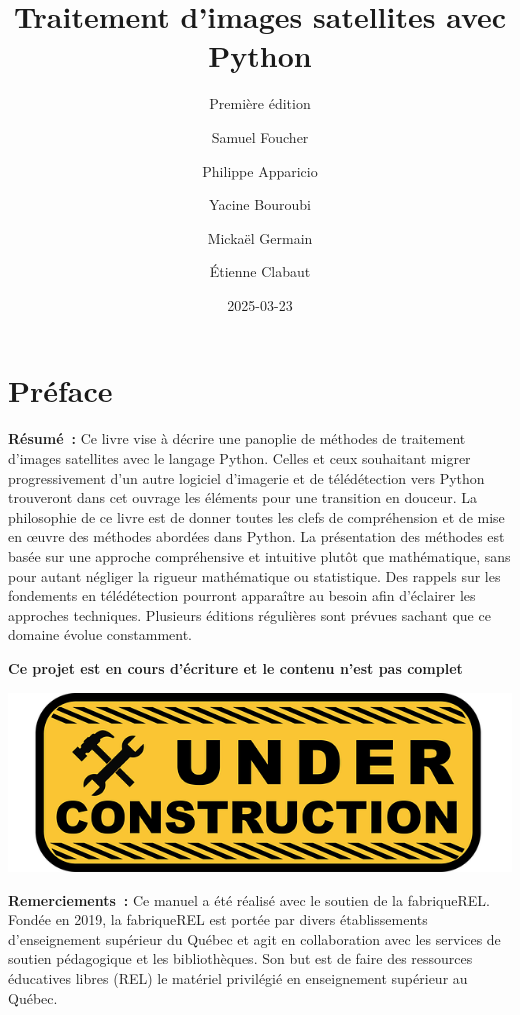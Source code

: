 \documentclass[
  11pt,
  letterpaper,
  open=any,
  twoside=false,
  french]{scrbook}
\title{Traitement d'images satellites avec Python}
\subtitle{Première édition}
\author{Samuel Foucher \and Philippe Apparicio \and Yacine
Bouroubi \and Mickaël Germain \and Étienne Clabaut}
\date{2025-03-23}
\renewcommand*\contentsname{Table des matières}
\newcommand\contentsname{Table des matières}
\begin{document}
\frontmatter
\maketitle

\renewcommand*\contentsname{Table des matières}
{
\hypersetup{linkcolor=}
\setcounter{tocdepth}{2}
\tableofcontents
}
\listoffigures
\listoftables

\mainmatter
{}

\chapter*{Préface}\label{pruxe9face}


\renewcommand{\partname}{}

\textbf{Résumé~:} Ce livre vise à décrire une panoplie de méthodes de
traitement d'images satellites avec le langage Python. Celles et ceux
souhaitant migrer progressivement d'un autre logiciel d'imagerie et de
télédétection vers Python trouveront dans cet ouvrage les éléments pour
une transition en douceur. La philosophie de ce livre est de donner
toutes les clefs de compréhension et de mise en œuvre des méthodes
abordées dans Python. La présentation des méthodes est basée sur une
approche compréhensive et intuitive plutôt que mathématique, sans pour
autant négliger la rigueur mathématique ou statistique. Des rappels sur
les fondements en télédétection pourront apparaître au besoin afin
d'éclairer les approches techniques. Plusieurs éditions régulières sont
prévues sachant que ce domaine évolue constamment.

\textbf{Ce projet est en cours d'écriture et le contenu n'est pas
complet}

\includegraphics[width=0.5\linewidth,height=\textheight,keepaspectratio]{images/logos/under-construction-2408062_640.png}\hfill

\textbf{Remerciements~:} Ce manuel a été réalisé avec le soutien de la
fabriqueREL. Fondée en 2019, la fabriqueREL est portée par divers
établissements d'enseignement supérieur du Québec et agit en
collaboration avec les services de soutien pédagogique et les
bibliothèques. Son but est de faire des ressources éducatives libres
(REL) le matériel privilégié en enseignement supérieur au Québec.
\end{document}
